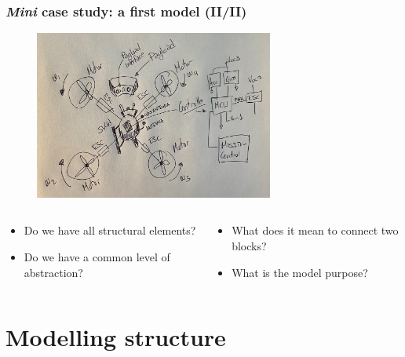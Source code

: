 \documentclass[xcolor=dvipsnames,t]{beamer}
\begin{document}
\begin{frame}
\frametitle {\textit{Mini} case study: a first model (II/II)}

\begin{figure}
\includegraphics[width=0.7\textwidth]{quadModel1.jpg}
\end{figure}
\vspace{-5mm}


\begin{columns}

\begin{column}{0.5\textwidth}

\begin{itemize}
\small
\item  Do we have all structural elements?
\item Do we have a common level of abstraction?
\end{itemize}
\end{column}

\begin{column}{0.5\textwidth}

\begin{itemize}
\small
\item What does it mean to connect two blocks?
\item What is the model purpose?
\end{itemize}
\end{column}

\end{columns}


\end{frame}


\section{Modelling structure}
\end{document}

